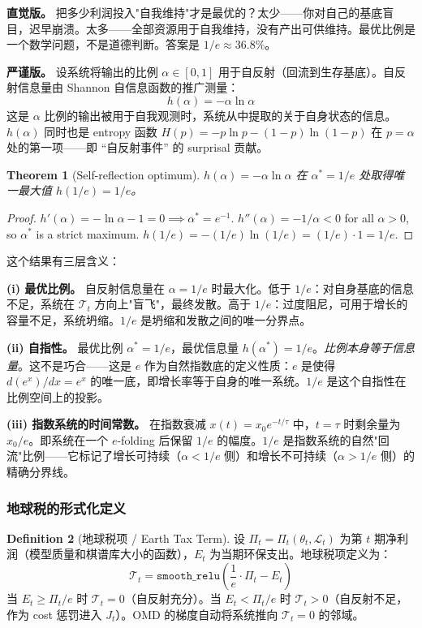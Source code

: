 \documentclass[11pt,a4paper]{article}
\newtheorem{theorem}{Theorem}[section]
\theoremstyle{definition}
\newtheorem{definition}[theorem]{Definition}
\theoremstyle{remark}
\begin{document}
\textbf{直觉版。}
把多少利润投入"自我维持"才是最优的？太少——你对自己的基底盲目，迟早崩溃。太多——全部资源用于自我维持，没有产出可供维持。最优比例是一个数学问题，不是道德判断。答案是 $1/e \approx 36.8\%$。

\textbf{严谨版。}
设系统将输出的比例 $\alpha \in [0,1]$ 用于自反射（回流到生存基底）。自反射信息量由 Shannon 自信息函数的推广测量：
\[
  h(\alpha) = -\alpha \ln \alpha
\]
这是 $\alpha$ 比例的输出被用于自我观测时，系统从中提取的关于自身状态的信息。$h(\alpha)$ 同时也是 entropy 函数 $H(p) = -p\ln p - (1-p)\ln(1-p)$ 在 $p = \alpha$ 处的第一项——即 ``自反射事件'' 的 surprisal 贡献。

\begin{theorem}[Self-reflection optimum]\label{thm:one_over_e}
$h(\alpha) = -\alpha \ln \alpha$ 在 $\alpha^* = 1/e$ 处取得唯一最大值 $h(1/e) = 1/e$。
\end{theorem}

\begin{proof}
$h'(\alpha) = -\ln\alpha - 1 = 0 \implies \alpha^* = e^{-1}$. $h''(\alpha) = -1/\alpha < 0$ for all $\alpha > 0$, so $\alpha^*$ is a strict maximum. $h(1/e) = -(1/e)\ln(1/e) = (1/e) \cdot 1 = 1/e$.
\end{proof}

这个结果有三层含义：

\textbf{(i) 最优比例。} 自反射信息量在 $\alpha = 1/e$ 时最大化。低于 $1/e$：对自身基底的信息不足，系统在 $\mathcal{T}_t$ 方向上"盲飞"，最终发散。高于 $1/e$：过度阻尼，可用于增长的容量不足，系统坍缩。$1/e$ 是坍缩和发散之间的唯一分界点。

\textbf{(ii) 自指性。} 最优比例 $\alpha^* = 1/e$，最优信息量 $h(\alpha^*) = 1/e$。\emph{比例本身等于信息量}。这不是巧合——这是 $e$ 作为自然指数底的定义性质：$e$ 是使得 $d(e^x)/dx = e^x$ 的唯一底，即增长率等于自身的唯一系统。$1/e$ 是这个自指性在比例空间上的投影。

\textbf{(iii) 指数系统的时间常数。} 在指数衰减 $x(t) = x_0 e^{-t/\tau}$ 中，$t = \tau$ 时剩余量为 $x_0/e$。即系统在一个 $e$-folding 后保留 $1/e$ 的幅度。$1/e$ 是指数系统的自然"回流"比例——它标记了增长可持续（$\alpha < 1/e$ 侧）和增长不可持续（$\alpha > 1/e$ 侧）的精确分界线。


\subsubsection*{地球税的形式化定义}

\begin{definition}[地球税项 / Earth Tax Term]\label{def:earth_tax}
设 $\Pi_t = \Pi_t(\theta_t, \mathcal{L}_t)$ 为第 $t$ 期净利润（模型质量和棋谱库大小的函数），$E_t$ 为当期环保支出。地球税项定义为：
\[
  \mathcal{T}_t = \texttt{smooth\_relu}\!\left(\frac{1}{e} \cdot \Pi_t - E_t\right)
\]
当 $E_t \geq \Pi_t / e$ 时 $\mathcal{T}_t = 0$（自反射充分）。当 $E_t < \Pi_t / e$ 时 $\mathcal{T}_t > 0$（自反射不足，作为 cost 惩罚进入 $J_t$）。OMD 的梯度自动将系统推向 $\mathcal{T}_t = 0$ 的邻域。
\end{definition}
\end{document}
